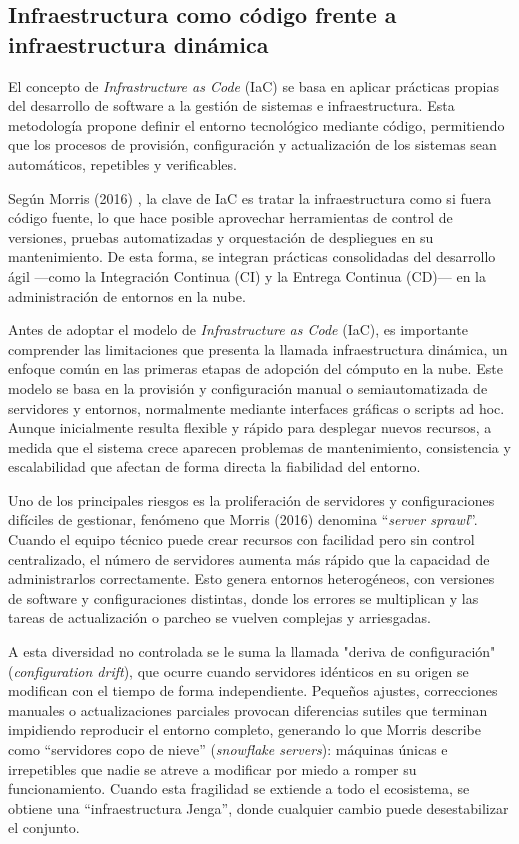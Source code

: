 \subsection*{Infraestructura como código frente a infraestructura dinámica}

El concepto de \textit{Infrastructure as Code} (IaC) se basa en aplicar prácticas propias del desarrollo de software a la gestión de sistemas e infraestructura. Esta metodología propone definir el entorno tecnológico mediante código, permitiendo que los procesos de provisión, configuración y actualización de los sistemas sean automáticos, repetibles y verificables.

Según Morris (2016) \cite{Morris2016}, la clave de IaC es tratar la infraestructura como si fuera código fuente, lo que hace posible aprovechar herramientas de control de versiones, pruebas automatizadas y orquestación de despliegues en su mantenimiento. De esta forma, se integran prácticas consolidadas del desarrollo ágil —como la Integración Continua (CI) y la Entrega Continua (CD)— en la administración de entornos en la nube.

Antes de adoptar el modelo de \textit{Infrastructure as Code} (IaC), es importante comprender las limitaciones que presenta la llamada infraestructura dinámica, un enfoque común en las primeras etapas de adopción del cómputo en la nube. Este modelo se basa en la provisión y configuración manual o semiautomatizada de servidores y entornos, normalmente mediante interfaces gráficas o scripts ad hoc. Aunque inicialmente resulta flexible y rápido para desplegar nuevos recursos, a medida que el sistema crece aparecen problemas de mantenimiento, consistencia y escalabilidad que afectan de forma directa la fiabilidad del entorno.

Uno de los principales riesgos es la proliferación de servidores y configuraciones difíciles de gestionar, fenómeno que Morris (2016) \cite{Morris2016} denomina “\textit{server sprawl}”. Cuando el equipo técnico puede crear recursos con facilidad pero sin control centralizado, el número de servidores aumenta más rápido que la capacidad de administrarlos correctamente. Esto genera entornos heterogéneos, con versiones de software y configuraciones distintas, donde los errores se multiplican y las tareas de actualización o parcheo se vuelven complejas y arriesgadas.

A esta diversidad no controlada se le suma la llamada "deriva de configuración" (\textit{configuration drift}), que ocurre cuando servidores idénticos en su origen se modifican con el tiempo de forma independiente. Pequeños ajustes, correcciones manuales o actualizaciones parciales provocan diferencias sutiles que terminan impidiendo reproducir el entorno completo, generando lo que Morris describe como “servidores copo de nieve” (\textit{snowflake servers}): máquinas únicas e irrepetibles que nadie se atreve a modificar por miedo a romper su funcionamiento. Cuando esta fragilidad se extiende a todo el ecosistema, se obtiene una “infraestructura Jenga”, donde cualquier cambio puede desestabilizar el conjunto.


